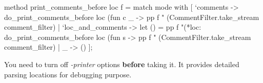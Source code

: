 \begin{ocamlcode}
    method print_comments_before loc f =
      match mode with
      [ `comments ->
          do_print_comments_before loc (fun c _ -> pp f "%
            (CommentFilter.take_stream comment_filter)
      | `loc_and_comments ->
          let () = pp f "(*loc: %
          do_print_comments_before loc
            (fun s -> pp f "%
            (CommentFilter.take_stream comment_filter)
      | _ -> () ];
\end{ocamlcode}


You need to turn off \textit{-printer} options \textbf{before} taking
it. It provides detailed parsing locations for debugging purpose.

